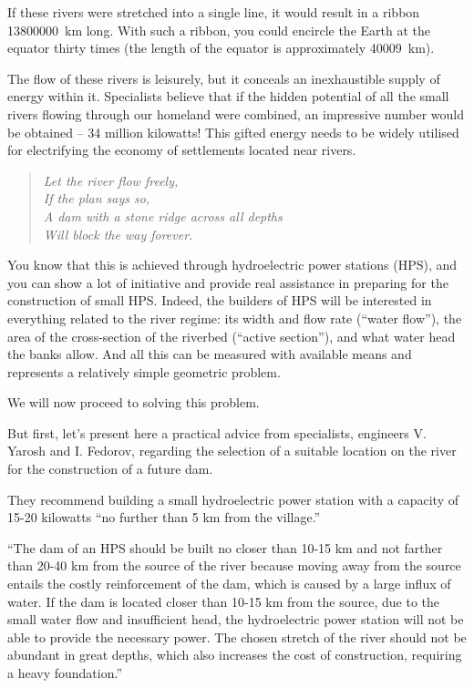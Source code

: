 If these rivers were stretched into a single line, it would result in a ribbon \SI{13800000}{\kilo\meter} long. With such a ribbon, you could encircle the Earth at the equator thirty times (the length of the equator is approximately \SI{40009}{\kilo\meter}).

The flow of these rivers is leisurely, but it conceals an inexhaustible supply of energy within it. Specialists believe that if the hidden potential of all the small rivers flowing through our homeland were combined, an impressive number would be obtained -- 34 million kilowatts! This gifted energy needs to be widely utilised for electrifying the economy of settlements located near rivers.

\begin{quote}
\emph{Let the river flow freely,\\
If the plan says so,\\
A dam with a stone ridge across all depths\\
Will block the way forever.}\\[-10pt]
\end{quote}

You know that this is achieved through hydroelectric power stations (HPS), and you can show a lot of initiative and provide real assistance in preparing for the construction of small HPS. Indeed, the builders of HPS will be interested in everything related to the river regime: its width and flow rate (``water flow''), the area of the cross-section of the riverbed (``active section''), and what water head the banks allow. And all this can be measured with available means and represents a relatively simple geometric problem.

We will now proceed to solving this problem.

But first, let's present here a practical advice from specialists, engineers V. Yarosh and I. Fedorov, regarding the selection of a suitable location on the river for the construction of a future dam.

They recommend building a small hydroelectric power station with a capacity of 15-20 kilowatts ``no further than 5 km from the village.''

``The dam of an HPS should be built no closer than 10-15 km and not farther than 20-40 km from the source of the river because moving away from the source entails the costly reinforcement of the dam, which is caused by a large influx of water. If the dam is located closer than 10-15 km from the source, due to the small water flow and insufficient head, the hydroelectric power station will not be able to provide the necessary power. The chosen stretch of the river should not be abundant in great depths, which also increases the cost of construction, requiring a heavy foundation.''

